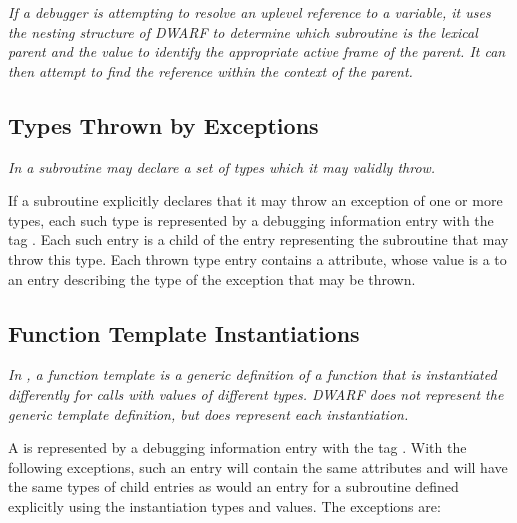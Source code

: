 \textit{If a debugger is attempting to resolve an up\dash level reference
to a variable, it uses the nesting structure of DWARF to
determine which subroutine is the lexical parent and the
\DWATstaticlink{} value to identify the appropriate active
frame of the parent. It can then attempt to find the reference
within the context of the parent.}


\subsection{Types Thrown by Exceptions}
\label{chap:typesthrownbyexceptions}

\textit{In  a subroutine may declare a set of types which
it may validly throw.}

If a subroutine explicitly declares that it may throw
an 
exception of one or more types, each such type is
represented by a debugging information entry with 
the tag
\DWTAGthrowntypeTARG.  
Each such entry is a child of the entry
representing the subroutine that may throw this type. Each
thrown type entry contains 
a \DWATtype{} attribute, whose
value is a  
to an entry describing the type of the
exception that may be thrown.

\subsection{Function Template Instantiations}
\label{chap:functiontemplateinstantiations}

\textit{In , a function template is a generic definition of
a function that is instantiated differently for calls with
values of different types. DWARF does not represent the generic
template definition, but does represent each instantiation.}

A  
is represented by a debugging information entry with the 
tag \DWTAGsubprogram. 
With the following
exceptions, such an entry will contain the same attributes and
will have the same types of child entries as would an entry
for a subroutine defined explicitly using the instantiation
types and values. The exceptions are:


